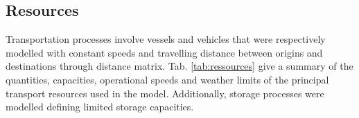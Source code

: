 \subsection{Resources}
Transportation processes involve vessels and vehicles that were respectively modelled with constant speeds and travelling distance between origins and destinations through distance matrix. Tab. \ref{tab:ressources} give a summary of the quantities, capacities, operational speeds and weather limits of the principal transport resources used in the model. Additionally, storage processes were modelled defining limited storage capacities.